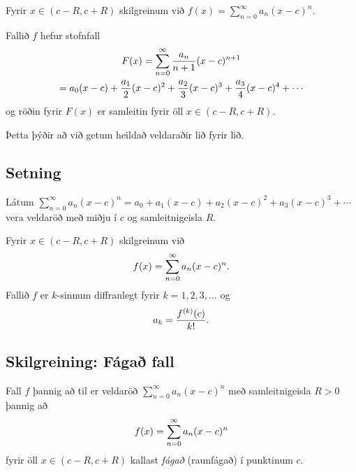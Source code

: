 \documentclass[a4paper,10pt,icelandic]{sphinxmanual}
\begin{document}
Fyrir \(x\in(c-R, c+R)\) skilgreinum við
\(f(x)=\sum_{n=0}^\infty a_n(x-c)^n\).

Fallið \(f\) hefur stofnfall
\begin{gather}
\begin{split}\begin{gathered}
F(x)=\sum_{n=0}^\infty \frac{a_n}{n+1}(x-c)^{n+1} \\
=a_0(x-c)+\frac{a_1}{2}(x-c)^2+\frac{a_2}{3}(x-c)^3+
\frac{a_3}{4}(x-c)^4+\cdots\end{gathered}\end{split}\notag
\end{gather}
og röðin fyrir \(F(x)\) er samleitin fyrir öll
\(x\in(c-R, c+R)\).

Þetta þýðir að við getum heildað veldaraðir lið fyrir lið.


\subsection{Setning}
\label{kafli10:id3}
Látum \(\sum_{n=0}^\infty a_n(x-c)^n=a_0+a_1(x-c)+a_2(x-c)^2+a_3(x-c)^3+\cdots\)
vera veldaröð með miðju í \(c\) og samleitnigeisla \(R\).

Fyrir \(x\in(c-R, c+R)\) skilgreinum við
\begin{gather}
\begin{split}f(x)=\sum_{n=0}^\infty a_n(x-c)^n.\end{split}\notag
\end{gather}
Fallið \(f\) er \(k\)-sinnum diffranlegt fyrir \(k=1, 2, 3, \ldots\) og
\begin{gather}
\begin{split}a_k=\frac{f^{(k)}(c)}{k!}.\end{split}\notag
\end{gather}

\subsection{Skilgreining: Fágað fall}
\label{kafli10:skilgreining-faga-fall}\label{kafli10:index-5}
Fall \(f\) þannig að til er veldaröð
\(\sum_{n=0}^\infty a_n(x-c)^n\) með samleitnigeisla \(R>0\)
þannig að
\begin{gather}
\begin{split}f(x)=\sum_{n=0}^\infty a_n(x-c)^n\end{split}\notag
\end{gather}
fyrir öll \(x\in(c-R, c+R)\) kallast \emph{fágað} (raunfágað) í punktinum
\(c\).
\end{document}
